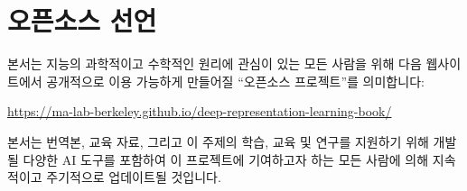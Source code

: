 \documentclass[../../book-main_ko.tex]{subfiles}
\begin{document}
\chapter*{오픈소스 선언}

본서는 지능의 과학적이고 수학적인 원리에 관심이 있는 모든 사람을 위해 다음 웹사이트에서 공개적으로 이용 가능하게 만들어질 ``오픈소스 프로젝트''를 의미합니다:
\begin{center}
    \url{https://ma-lab-berkeley.github.io/deep-representation-learning-book/}
\end{center}
본서는 번역본, 교육 자료, 그리고 이 주제의 학습, 교육 및 연구를 지원하기 위해 개발될 다양한 AI 도구를 포함하여 이 프로젝트에 기여하고자 하는 모든 사람에 의해 지속적이고 주기적으로 업데이트될 것입니다.
\end{document}
